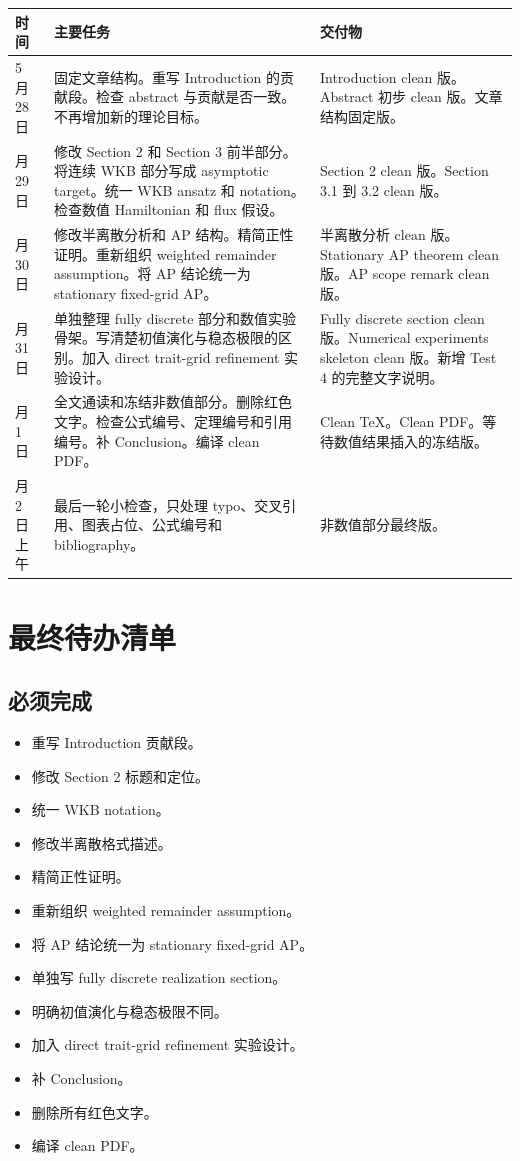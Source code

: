 \documentclass[11pt,a4paper]{ctexart}
\newcommand{\todoitem}[1]{\item[$\square$] #1}
\begin{document}
\begin{tabularx}{\textwidth}{@{}p{2.6cm}X X@{}}
\toprule
时间 & 主要任务 & 交付物 \\
\midrule
5 月 28 日 & 固定文章结构。重写 Introduction 的贡献段。检查 abstract 与贡献是否一致。不再增加新的理论目标。 & Introduction clean 版。Abstract 初步 clean 版。文章结构固定版。 \\
\addlinespace
5 月 29 日 & 修改 Section 2 和 Section 3 前半部分。将连续 WKB 部分写成 asymptotic target。统一 WKB ansatz 和 notation。检查数值 Hamiltonian 和 flux 假设。 & Section 2 clean 版。Section 3.1 到 3.2 clean 版。 \\
\addlinespace
5 月 30 日 & 修改半离散分析和 AP 结构。精简正性证明。重新组织 weighted remainder assumption。将 AP 结论统一为 stationary fixed-grid AP。 & 半离散分析 clean 版。Stationary AP theorem clean 版。AP scope remark clean 版。 \\
\addlinespace
5 月 31 日 & 单独整理 fully discrete 部分和数值实验骨架。写清楚初值演化与稳态极限的区别。加入 direct trait-grid refinement 实验设计。 & Fully discrete section clean 版。Numerical experiments skeleton clean 版。新增 Test 4 的完整文字说明。 \\
\addlinespace
6 月 1 日 & 全文通读和冻结非数值部分。删除红色文字。检查公式编号、定理编号和引用编号。补 Conclusion。编译 clean PDF。 & Clean TeX。Clean PDF。等待数值结果插入的冻结版。 \\
\addlinespace
6 月 2 日上午 & 最后一轮小检查，只处理 typo、交叉引用、图表占位、公式编号和 bibliography。 & 非数值部分最终版。 \\
\bottomrule
\end{tabularx}

\section{最终待办清单}

\subsection{必须完成}

\begin{itemize}
    \todoitem{重写 Introduction 贡献段。}
    \todoitem{修改 Section 2 标题和定位。}
    \todoitem{统一 WKB notation。}
    \todoitem{修改半离散格式描述。}
    \todoitem{精简正性证明。}
    \todoitem{重新组织 weighted remainder assumption。}
    \todoitem{将 AP 结论统一为 stationary fixed-grid AP。}
    \todoitem{单独写 fully discrete realization section。}
    \todoitem{明确初值演化与稳态极限不同。}
    \todoitem{加入 direct trait-grid refinement 实验设计。}
    \todoitem{补 Conclusion。}
    \todoitem{删除所有红色文字。}
    \todoitem{编译 clean PDF。}
\end{itemize}
\end{document}
